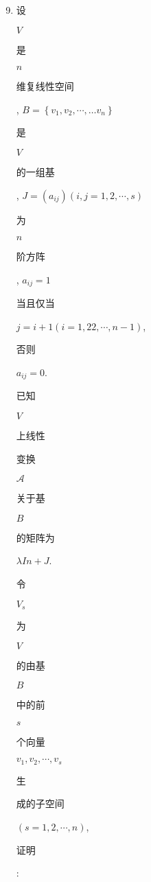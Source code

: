 \documentclass[10pt]{article}
\begin{document}
\begin{enumerate}
  \setcounter{enumi}{8}
  \item \begin{CJK}{UTF8}{mj}设\end{CJK} $V$ \begin{CJK}{UTF8}{mj}是\end{CJK} $n$ \begin{CJK}{UTF8}{mj}维复线性空间\end{CJK}, $B=\left\{v_{1}, v_{2}, \cdots, \ldots v_{n}\right\}$ \begin{CJK}{UTF8}{mj}是\end{CJK} $V$ \begin{CJK}{UTF8}{mj}的一组基\end{CJK}, $J=\left(a_{i j}\right)(i, j=1,2, \cdots, s)$ \begin{CJK}{UTF8}{mj}为\end{CJK} $n$ \begin{CJK}{UTF8}{mj}阶方阵\end{CJK}, $a_{i j}=1$ \begin{CJK}{UTF8}{mj}当且仅当\end{CJK} $j=i+1(i=1,22, \cdots, n-1)$, \begin{CJK}{UTF8}{mj}否则\end{CJK} $a_{i j}=0$. \begin{CJK}{UTF8}{mj}已知\end{CJK} $V$ \begin{CJK}{UTF8}{mj}上线性\end{CJK} \begin{CJK}{UTF8}{mj}变换\end{CJK} $\mathscr{A}$ \begin{CJK}{UTF8}{mj}关于基\end{CJK} $B$ \begin{CJK}{UTF8}{mj}的矩阵为\end{CJK} $\lambda I n+J$. \begin{CJK}{UTF8}{mj}令\end{CJK} $V_{s}$ \begin{CJK}{UTF8}{mj}为\end{CJK} $V$ \begin{CJK}{UTF8}{mj}的由基\end{CJK} $B$ \begin{CJK}{UTF8}{mj}中的前\end{CJK} $s$ \begin{CJK}{UTF8}{mj}个向量\end{CJK} $v_{1}, v_{2}, \cdots, v_{s}$ \begin{CJK}{UTF8}{mj}生\end{CJK} \begin{CJK}{UTF8}{mj}成的子空间\end{CJK} $(s=1,2, \cdots, n)$, \begin{CJK}{UTF8}{mj}证明\end{CJK}:
\end{enumerate}
\end{document}

